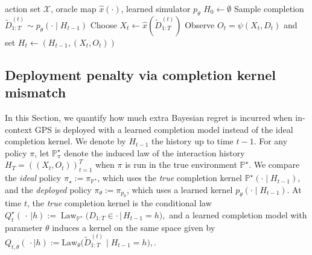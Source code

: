 \documentclass[11pt]{article}
\renewcommand{\P}{\mathbb{P}}
\DeclareMathOperator{\Law}{Law}
\providecommand{\cX}{\mathcal{X}}
\begin{document}
\begin{algorithm}[t]
\caption{In-context Generative Posterior Sampling (ICGPS)}
\label{alg:gps}
\small
\begin{algorithmic}[1]
\Require action set $\cX$, oracle map $\hat x(\cdot)$, learned simulator $p_\theta$
\State $H_0 \gets \emptyset$
  \State Sample completion $\widetilde D_{1:T}^{(t)} \sim p_\theta(\cdot\mid H_{t-1})$
  \State Choose $X_t \gets \hat x(\widetilde D_{1:T}^{(t)})$
  \State Observe $O_t=\psi(X_t,D_t)$ and set $H_t \gets (H_{t-1},(X_t,O_t))$
\EndFor
\end{algorithmic}
\end{algorithm}
































\subsection{Deployment penalty via completion kernel mismatch}\label{subsec:reduction}

In this Section, we quantify how much extra Bayesian regret is incurred when in-context GPS is deployed with a learned completion model instead of the ideal completion kernel. We denote by \(H_{t-1}\) the
history up to time \(t-1\). For any policy $\pi$, let $\P^\star_\pi$ denote the induced law of the interaction history
$H_T=((X_t,O_t))_{t=1}^T$ when $\pi$ is run in the true environment $\P^\star$. We compare the \emph{ideal} policy $\pi_\star := \pi_{\P^\star}$, which uses the \emph{true} completion kernel $\P^\star(\cdot\mid H_{t-1})$, and the \emph{deployed} policy $\pi_\theta := \pi_{p_\theta}$, which uses a learned kernel $p_\theta(\cdot\mid H_{t-1})$. 
At time \(t\), the \emph{true} completion kernel is the conditional law
\(
Q_t^\star(\,\cdot\,|h) := \Law_{\P^\star}\!\bigl(D_{1:T}\in\cdot \,\big|\, H_{t-1}=h\bigr),
\)
and a learned completion model with parameter \(\theta\) induces a kernel on the same space given by \(Q_{t,\theta}(\,\cdot \mid h) := \mathrm{Law}_\theta\bigl(\widetilde D_{1:T}^{(t)} \mid H_{t-1}=h\bigr),\). 
\end{document}
